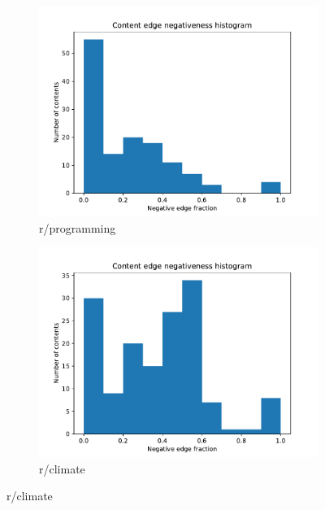 \documentclass{beamer}
\begin{document}
\begin{frame}[c]
\begin{figure}
\begin{center}
\begin{subfigure}[b]{0.4\textwidth}
				\label{fig:out/covid19200/neg-fraction-content-hist.pdf}
			\end{subfigure}
			\begin{subfigure}[b]{0.4\textwidth}
				\centering
				\includegraphics[width=\textwidth]{out/programming200/neg-fraction-content-hist.pdf}
				\caption{r/programming}
				\label{fig:out/bbcscience200/neg-fraction-content-hist.pdf}
			\end{subfigure}
			\begin{subfigure}[b]{0.4\textwidth}
				\centering
				\includegraphics[width=\textwidth]{out/climate200/neg-fraction-content-hist.pdf}
				\caption{r/climate}
				\label{fig:out/bbctech200/neg-fraction-content-hist.pdf}
			\end{subfigure}
		\end{center}
	\end{figure}

\end{frame}
\end{document}
